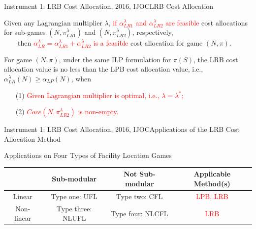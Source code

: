 \documentclass[14pt]{beamer}
\begin{document}
\begin{frame}{Instrument 1: LRB Cost Allocation, {\footnotesize 2016, IJOC}}{LRB Cost Allocation}
\footnotesize
\begin{theorem}\label{thm:lrcostallocationfeasible}
\justifying
\rm{
Given any Lagrangian multiplier $\lambda$, \textcolor{red}{if $\alpha_{LR1}^{\lambda}$ and $\alpha_{LR2}^{\lambda}$ are feasible} cost allocations for sub-games $(N,\pi_{LR1}^{\lambda})$ and $(N,\pi_{LR2}^{\lambda})$, respectively,\\
\vspace{3mm}
~~~~then \textcolor{red}{$\alpha_{LR}^{\lambda} = \alpha_{LR1}^{\lambda} + \alpha_{LR2}^{\lambda}$ is a feasible} cost allocation for game $(N,\pi)$.}
\end{theorem}
\vspace{-0.1cm}
\begin{theorem}\label{thm:lagcostallocation1}
\rm
For game $(N,\pi)$, under the same ILP formulation for $\pi(S)$, the LRB cost allocation value is no less than the LPB cost allocation value, i.e., $\alpha_{LR}^{\lambda}(N) \geq \alpha_{LP}(N)$, when
\begin{itemize}
\item[(1)] \textcolor{red}{Given Lagrangian multiplier is optimal, i.e., $\lambda = \lambda^*$;}
\item[(2)] \textcolor{red}{$Core(N,\pi_{LR2}^{\lambda})$ is non-empty.}
\end{itemize}
\end{theorem}
\end{frame}




\begin{frame}{Instrument 1: LRB Cost Allocation, {\footnotesize 2016, IJOC}}{Applications of the LRB Cost Allocation Method}
\small
\begin{shaded}
\centering
Applications on Four Types of Facility Location Games
\end{shaded}
\begin{table}[H]
\centering
\tabcolsep=2pt
\footnotesize
\renewcommand\arraystretch{2}
\begin{tabular}[!h]{c| c c| c}

\multicolumn{1}{c|}{} &\multicolumn{1}{c}{Sub-modular} & \multicolumn{1}{c}{Not Sub-modular}& \multicolumn{1}{|c}{Applicable Method(s)}\\
\hline
Linear	&Type one: UFL	&Type two: CFL	&\textcolor{red}{LPB, LRB}\\

Non-linear	&Type three: NLUFL	&Type four: NLCFL	&\textcolor{red}{LRB}\\
\end{tabular}
\end{table}

\end{frame}
\end{document}
